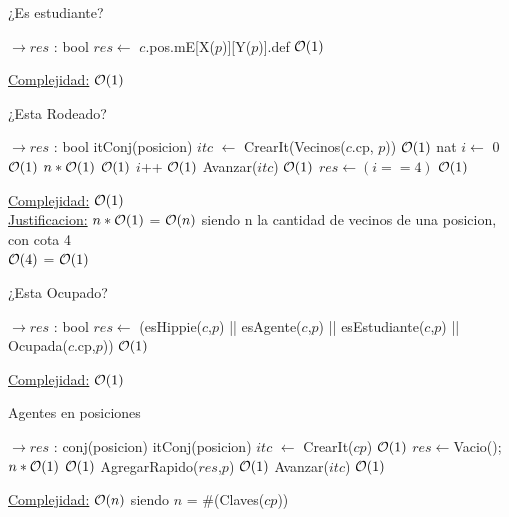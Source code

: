 \begin{Algoritmos}
\begin{algorithm}[H]
\caption{¿Es estudiante?}
\begin{algorithmic}[1]
	 $\to res$ : bool
	\State $res \gets$ $c$.pos.mE[X($p$)][Y($p$)].def \Comment $\mathcal{O}(1)$
	\EndProcedure
\end{algorithmic}
\underline{Complejidad:} $\mathcal{O}(1)$
\end{algorithm}


\begin{algorithm}[H]
\caption{¿Esta Rodeado?}
\begin{algorithmic}[1]
	 $\to res$ : bool
	\State itConj(posicion) $itc$ $\gets$ CrearIt(Vecinos($c$.cp, $p$)) \Comment $\mathcal{O}(1)$
	\State nat $i \gets$ 0 \Comment $\mathcal{O}(1)$
		 \Comment $n*\mathcal{O}(1)$
			 \Comment $\mathcal{O}(1)$
				\State $i$++ \Comment $\mathcal{O}(1)$
			\EndIf
			Avanzar($itc$) \Comment $\mathcal{O}(1)$
		\EndWhile
		$res \gets (i==4)$ \Comment $\mathcal{O}(1)$
	\EndProcedure
\end{algorithmic}
\underline{Complejidad:} $\mathcal{O}(1)$\\
\underline{Justificacion:} $n*\mathcal{O}(1)$ = $\mathcal{O}(n)$ siendo n la cantidad de vecinos de una posicion, con cota 4\\
$\mathcal{O}(4)$ = $\mathcal{O}(1)$
\end{algorithm}



\begin{algorithm}[H]
\caption{¿Esta Ocupado?}
\begin{algorithmic}[1]
	 $\to res$ : bool
	\State $res \gets$ (esHippie($c$,$p$) || esAgente($c$,$p$) || esEstudiante($c$,$p$) || Ocupada($c$.cp,$p$)) \Comment $\mathcal{O}(1)$
	\EndProcedure
\end{algorithmic}
\underline{Complejidad:} $\mathcal{O}(1)$
\end{algorithm}

\begin{algorithm}[H]
\caption{Agentes en posiciones}
\begin{algorithmic}[1]
	 $\to res$ : conj(posicion)
	\State itConj(posicion) $itc$ $\gets$ CrearIt($cp$) \Comment $\mathcal{O}(1)$
	$res \gets $Vacio();
	 \Comment $n*\mathcal{O}(1)$
			 \Comment $\mathcal{O}(1)$
				\State AgregarRapido($res$,$p$) \Comment $\mathcal{O}(1)$
			\EndIf
			Avanzar($itc$) \Comment $\mathcal{O}(1)$
		\EndWhile
	\EndProcedure
\end{algorithmic}
\underline{Complejidad:} $\mathcal{O}(n)$ siendo $n$ = $\#$(Claves($cp$))
\end{algorithm}



\end{Algoritmos}
